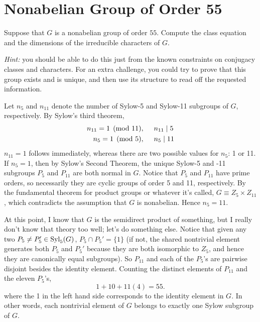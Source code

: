 \documentclass[12pt]{article}
\begin{document}

\section{Nonabelian Group of Order 55}

Suppose that $G$ is a nonabelian group of order $55$.  Compute the class
equation and the dimensions of the irreducible characters of $G$.

\emph{Hint:} you should be able to do this just from the known constraints on
conjugacy classes and characters.  For an extra challenge, you could try to
prove that this group exists and is unique, and then use its structure to read
off the requested information.

\noindent\dotfill 

Let $n_5$ and $n_{11}$ denote the number of Sylow-5 and Sylow-11 subgroups of $G$, respectively. 
By Sylow's third theorem, 
\begin{align*}
  n_{11} = 1 \pmod{11}, \hspace{1.5em} & n_{11} \mid 5 \\ 
  n_{5} = 1 \pmod{5}, \hspace{1.5em} & n_{5} \mid 11 
\end{align*}
$n_{11} = 1$ follows immediately, whereas there are two possible values for $n_5$: 1 or 11. 
If $n_5 = 1$, then by Sylow's Second Theorem, the unique Sylow-5 and -11 subgroups $P_5$ and $P_{11}$ are both normal in $G$. 
Notice that $P_{5}$ and $P_{11}$ have prime orders, so necessarily they are cyclic groups of order 5 and 11, respectively. 
By the fundamental theorem for product groups or whatever it's called, $G \equiv Z_{5} \times Z_{11}$, which contradicts the assumption that $G$ is nonabelian. 
Hence $n_{5} = 11$. 

At this point, I know that $G$ is the semidirect product of something, but I really don't know that theory too well; 
let's do something else. 
Notice that given any two $P_{5} \neq P_{5}' \in \text{Syl}_{5}{(G)}$, $P_5 \cap P_{5}' = \{1\}$ (if not, the shared nontrivial element generates both $P_{5}$ and $P_{5}'$ because they are both isomorphic to $Z_5$, and hence they are canonically equal subgroups). 
So $P_{11}$ and each of the $P_5$'s are pairwise disjoint besides the identity element. 
Counting the distinct elements of $P_{11}$ and the eleven $P_5$'s, 
\begin{equation} \label{eq:8_syl_sum}
  1 + 10 + 11(4) = 55.
\end{equation}
where the 1 in the left hand side corresponds to the identity element in $G$. 
In other words, each nontrivial element of $G$ belongs to exactly one Sylow subgroup of $G$. 
\end{document}
